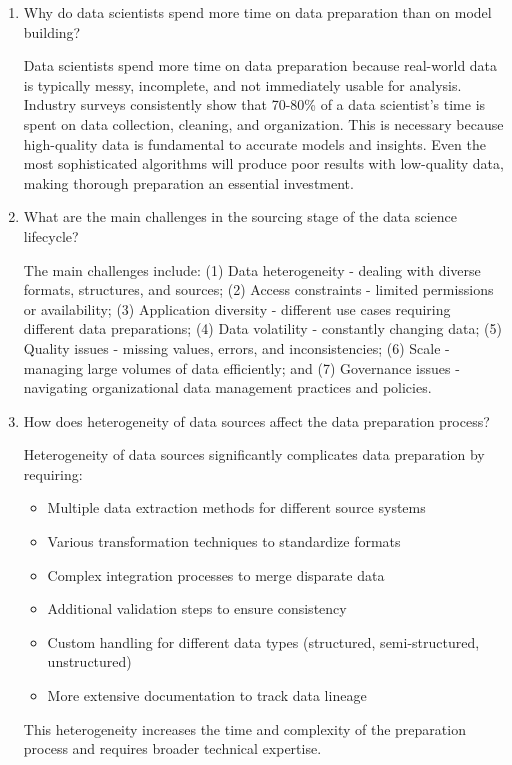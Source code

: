 \documentclass[12pt]{article}
\begin{document}
\begin{enumerate}
    \item Why do data scientists spend more time on data preparation than on model building?
    
    \begin{tcolorbox}[colback=blue!5!white,colframe=blue!75!black,title=Solution]
    Data scientists spend more time on data preparation because real-world data is typically messy, incomplete, and not immediately usable for analysis. Industry surveys consistently show that 70-80\% of a data scientist's time is spent on data collection, cleaning, and organization. This is necessary because high-quality data is fundamental to accurate models and insights. Even the most sophisticated algorithms will produce poor results with low-quality data, making thorough preparation an essential investment.
    \end{tcolorbox}
    
    \item What are the main challenges in the sourcing stage of the data science lifecycle?
    
    \begin{tcolorbox}[colback=blue!5!white,colframe=blue!75!black,title=Solution]
    The main challenges include: (1) Data heterogeneity - dealing with diverse formats, structures, and sources; (2) Access constraints - limited permissions or availability; (3) Application diversity - different use cases requiring different data preparations; (4) Data volatility - constantly changing data; (5) Quality issues - missing values, errors, and inconsistencies; (6) Scale - managing large volumes of data efficiently; and (7) Governance issues - navigating organizational data management practices and policies.
    \end{tcolorbox}
    
    \item How does heterogeneity of data sources affect the data preparation process?
    
    \begin{tcolorbox}[colback=blue!5!white,colframe=blue!75!black,title=Solution]
    Heterogeneity of data sources significantly complicates data preparation by requiring:
    \begin{itemize}
        \item Multiple data extraction methods for different source systems
        \item Various transformation techniques to standardize formats
        \item Complex integration processes to merge disparate data
        \item Additional validation steps to ensure consistency
        \item Custom handling for different data types (structured, semi-structured, unstructured)
        \item More extensive documentation to track data lineage
    \end{itemize}
    This heterogeneity increases the time and complexity of the preparation process and requires broader technical expertise.
    \end{tcolorbox}
    

\end{enumerate}
\end{document}
